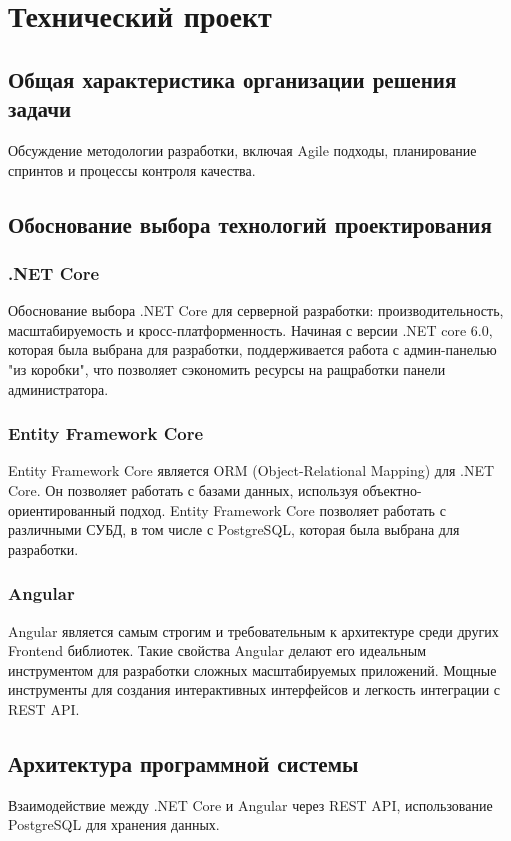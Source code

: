 \section{Технический проект}

\subsection{Общая характеристика организации решения задачи}
Обсуждение методологии разработки, включая Agile подходы, планирование спринтов и процессы контроля качества.

\subsection{Обоснование выбора технологий проектирования}
\subsubsection{.NET Core}
Обоснование выбора .NET Core для серверной разработки: производительность, масштабируемость и кросс-платформенность.
Начиная с версии .NET core 6.0, которая была выбрана для разработки, поддерживается работа с админ-панелью "из коробки", что позволяет сэкономить ресурсы на ращработки панели администратора.
\subsubsection{Entity Framework Core}
Entity Framework Core является ORM (Object-Relational Mapping) для .NET Core. Он позволяет работать с базами данных, используя объектно-ориентированный подход. Entity Framework Core позволяет работать с различными СУБД, в том числе с PostgreSQL, которая была выбрана для разработки.
\subsubsection{Angular}
Angular является самым строгим и требовательным к архитектуре среди других Frontend библиотек. Такие свойства Angular делают его идеальным инструментом для разработки сложных масштабируемых приложений. Мощные инструменты для создания интерактивных интерфейсов и легкость интеграции с REST API.
\subsection{Архитектура программной системы}
Взаимодействие между .NET Core и Angular через REST API, использование PostgreSQL для хранения данных.

